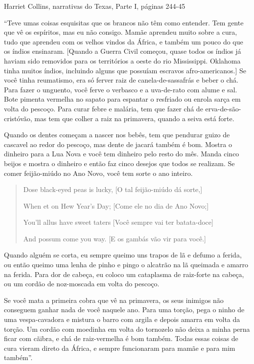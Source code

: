 Harriet Collins, narrativas do Texas, Parte I, páginas 244-45

``Teve umas coisas esquisitas que os brancos não têm como entender. Tem
gente que vê os espíritos, mas eu não consigo. Mamãe aprendeu muito
sobre a cura, tudo que aprendeu com os velhos vindos da África, e também
um pouco do que os índios ensinaram. {[}Quando a Guerra Civil começou,
quase todos os índios já haviam sido removidos para os territórios a
oeste do rio Mississippi. Oklahoma tinha muitos índios, incluindo alguns
que possuíam escravos afro-americanos.{]} Se você tinha reumatismo, era
só ferver raiz de canela-de-sassafrás e beber o chá. Para fazer o
unguento, você ferve o verbasco e a uva-de-rato com alume e sal. Bote
pimenta vermelha no sapato para espantar o resfriado ou enrola sarça em
volta do pescoço. Para curar febre e malária, tem que fazer chá de
erva-de-são-cristóvão, mas tem que colher a raiz na primavera, quando a
seiva está forte.

Quando os dentes começam a nascer nos bebês, tem que pendurar guizo de
cascavel ao redor do pescoço, mas dente de jacará também é bom. Mostra o
dinheiro para a Lua Nova e você tem dinheiro pelo resto do mês. Manda
cinco beijos e mostra o dinheiro e então faz cinco desejos que todos se
realizam. Se comer feijão-miúdo no Ano Novo, você tem sorte o ano
inteiro.

\begin{quote}
Dose black-eyed peas is lucky, {[}O tal feijão-miúdo dá sorte,{]}

When et on Hew Year's Day; {[}Come ele no dia de Ano Novo;{]}

You'll allus have sweet taters {[}Você sempre vai ter batata-doce{]}

And possum come you way. {[}E os gambás vão vir para você.{]}
\end{quote}

Quando alguém se corta, eu sempre queimo uns trapos de lã e defumo a
ferida, ou então queimo uma lenha de pinho e pingo o alcatrão na lã
queimada e amarro na ferida. Para dor de cabeça, eu coloco um cataplasma
de raiz-forte na cabeça, ou um cordão de noz-moscada em volta do
pescoço.

Se você mata a primeira cobra que vê na primavera, os seus inimigos não
conseguem ganhar nada de você naquele ano. Para uma torção, pega o ninho
de uma vespa-cavadora e mistura o barro com argila e depois amarra em
volta da torção. Um cordão com moedinha em volta do tornozelo não deixa
a minha perna ficar com cãibra, e chá de raiz-vermelha é bom também.
Todas essas coisas de cura vieram direto da África, e sempre funcionaram
para mamãe e para mim também''.

